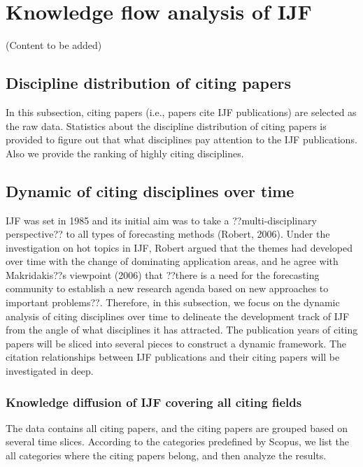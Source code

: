 \documentclass[11pt,a4paper]{elsarticle} %
\begin{document}
\section{Knowledge flow analysis of
IJF}\label{knowledge-flow-analysis-of-ijf}

(Content to be added)

\subsection{Discipline distribution of citing
papers}\label{discipline-distribution-of-citing-papers}

In this subsection, citing papers (i.e., papers cite IJF publications)
are selected as the raw data. Statistics about the discipline
distribution of citing papers is provided to figure out that what
disciplines pay attention to the IJF publications. Also we provide the
ranking of highly citing disciplines.

\subsection{Dynamic of citing disciplines over
time}\label{dynamic-of-citing-disciplines-over-time}

IJF was set in 1985 and its initial aim was to take a
??multi-disciplinary perspective?? to all types of forecasting methods
(Robert, 2006). Under the investigation on hot topics in IJF, Robert
argued that the themes had developed over time with the change of
dominating application areas, and he agree with Makridakis??s viewpoint
(2006) that ??there is a need for the forecasting community to establish
a new research agenda based on new approaches to important problems??.
Therefore, in this subsection, we focus on the dynamic analysis of
citing disciplines over time to delineate the development track of IJF
from the angle of what disciplines it has attracted. The publication
years of citing papers will be sliced into several pieces to construct a
dynamic framework. The citation relationships between IJF publications
and their citing papers will be investigated in deep.

\subsubsection{Knowledge diffusion of IJF covering all citing
fields}\label{knowledge-diffusion-of-ijf-covering-all-citing-fields}

The data contains all citing papers, and the citing papers are grouped
based on several time slices. According to the categories predefined by
Scopus, we list the all categories where the citing papers belong, and
then analyze the results.
\end{document}
